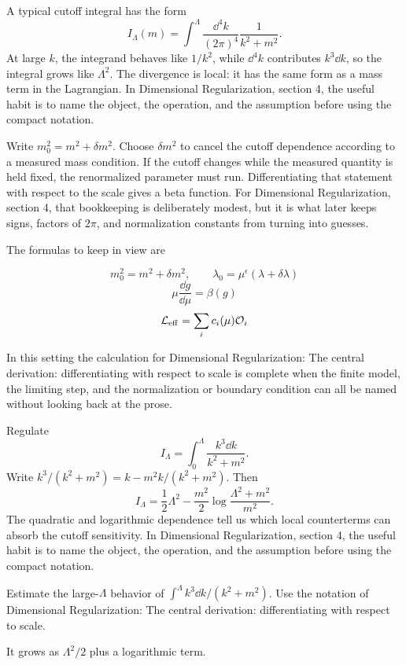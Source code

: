A typical cutoff integral has the form
\[
  I_\Lambda(m)=\int^{\Lambda}\frac{\dd^4k}{(2\pi)^4}\frac{1}{k^2+m^2}.
\]
At large \(k\), the integrand behaves like \(1/k^2\), while \(\dd^4k\) contributes \(k^3\dd k\), so the integral grows like \(\Lambda^2\).  The divergence is local: it has the same form as a mass term in the Lagrangian.  In Dimensional Regularization, section 4, the useful habit is to name the object, the operation, and the assumption before using the compact notation.

Write \(m_0^2=m^2+\delta m^2\).  Choose \(\delta m^2\) to cancel the cutoff dependence according to a measured mass condition.  If the cutoff changes while the measured quantity is held fixed, the renormalized parameter must run.  Differentiating that statement with respect to the scale gives a beta function.  For Dimensional Regularization, section 4, that bookkeeping is deliberately modest, but it is what later keeps signs, factors of \(2\pi\), and normalization constants from turning into guesses.

The formulas to keep in view are

\[
  m_0^2=m^2+\delta m^2,\qquad \lambda_0=\mu^\epsilon(\lambda+\delta\lambda)
\]
\[
  \mu\frac{\dd g}{\dd\mu}=\beta(g)
\]
\[
  \mathcal L_{\mathrm{eff}}=\sum_i c_i(\mu)\mathcal O_i
\]

In this setting the calculation for Dimensional Regularization: The central derivation: differentiating with respect to scale is complete when the finite model, the limiting step, and the normalization or boundary condition can all be named without looking back at the prose.




\begin{example}
Regulate
\[
  I_\Lambda=\int_0^\Lambda\frac{k^3\dd k}{k^2+m^2}.
\]
Write \(k^3/(k^2+m^2)=k-m^2k/(k^2+m^2)\).  Then
\[
  I_\Lambda=\frac12\Lambda^2-\frac{m^2}{2}\log\frac{\Lambda^2+m^2}{m^2}.
\]
The quadratic and logarithmic dependence tell us which local counterterms can absorb the cutoff sensitivity.  In Dimensional Regularization, section 4, the useful habit is to name the object, the operation, and the assumption before using the compact notation.
\end{example}



\begin{exercise}
Estimate the large-\(\Lambda\) behavior of \(\int^\Lambda k^3\dd k/(k^2+m^2)\).  Use the notation of Dimensional Regularization: The central derivation: differentiating with respect to scale.
\begin{answer}
It grows as \(\Lambda^2/2\) plus a logarithmic term.
\end{answer}
\end{exercise}


